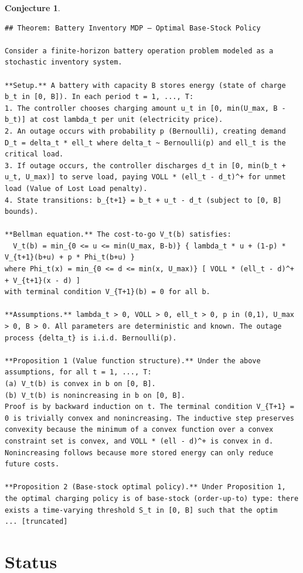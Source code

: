 \documentclass[11pt]{article}
\newtheorem{conjecture}{Conjecture}
\begin{document}
\begin{conjecture}
\begin{lstlisting}
## Theorem: Battery Inventory MDP — Optimal Base-Stock Policy

Consider a finite-horizon battery operation problem modeled as a stochastic inventory system.

**Setup.** A battery with capacity B stores energy (state of charge b_t in [0, B]). In each period t = 1, ..., T:
1. The controller chooses charging amount u_t in [0, min(U_max, B - b_t)] at cost lambda_t per unit (electricity price).
2. An outage occurs with probability p (Bernoulli), creating demand D_t = delta_t * ell_t where delta_t ~ Bernoulli(p) and ell_t is the critical load.
3. If outage occurs, the controller discharges d_t in [0, min(b_t + u_t, U_max)] to serve load, paying VOLL * (ell_t - d_t)^+ for unmet load (Value of Lost Load penalty).
4. State transitions: b_{t+1} = b_t + u_t - d_t (subject to [0, B] bounds).

**Bellman equation.** The cost-to-go V_t(b) satisfies:
  V_t(b) = min_{0 <= u <= min(U_max, B-b)} { lambda_t * u + (1-p) * V_{t+1}(b+u) + p * Phi_t(b+u) }
where Phi_t(x) = min_{0 <= d <= min(x, U_max)} [ VOLL * (ell_t - d)^+ + V_{t+1}(x - d) ]
with terminal condition V_{T+1}(b) = 0 for all b.

**Assumptions.** lambda_t > 0, VOLL > 0, ell_t > 0, p in (0,1), U_max > 0, B > 0. All parameters are deterministic and known. The outage process {delta_t} is i.i.d. Bernoulli(p).

**Proposition 1 (Value function structure).** Under the above assumptions, for all t = 1, ..., T:
(a) V_t(b) is convex in b on [0, B].
(b) V_t(b) is nonincreasing in b on [0, B].
Proof is by backward induction on t. The terminal condition V_{T+1} = 0 is trivially convex and nonincreasing. The inductive step preserves convexity because the minimum of a convex function over a convex constraint set is convex, and VOLL * (ell - d)^+ is convex in d. Nonincreasing follows because more stored energy can only reduce future costs.

**Proposition 2 (Base-stock optimal policy).** Under Proposition 1, the optimal charging policy is of base-stock (order-up-to) type: there exists a time-varying threshold S_t in [0, B] such that the optim
... [truncated]
\end{lstlisting}
\end{conjecture}

\section{Status}
\end{document}
